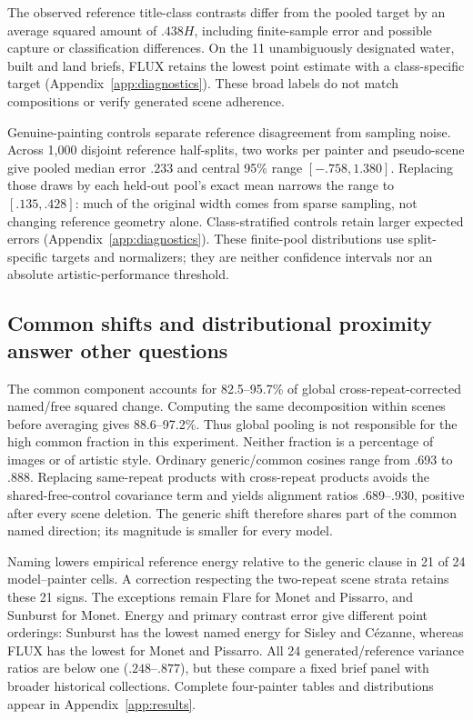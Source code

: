 

The observed reference title-class contrasts differ from the pooled target
by an average squared amount of $.438H$, including finite-sample error and
possible capture or classification differences. On the 11 unambiguously designated
water, built and land briefs, FLUX retains the lowest point estimate with a
class-specific target (Appendix~\ref{app:diagnostics}). These broad labels do
not match compositions or verify generated scene adherence.

Genuine-painting controls separate reference disagreement from sampling noise.
Across 1,000 disjoint reference half-splits, two works per painter and
pseudo-scene give pooled median error $.233$ and central 95\% range
$[-.758,1.380]$. Replacing those draws by each held-out pool's exact mean
narrows the range to $[.135,.428]$: much of the original width comes from sparse
sampling, not changing reference geometry alone. Class-stratified controls
retain larger expected errors (Appendix~\ref{app:diagnostics}). These finite-pool
distributions use split-specific targets and normalizers; they are neither
confidence intervals nor an absolute artistic-performance threshold.

\subsection{Common shifts and distributional proximity answer other questions}
The common component accounts for 82.5--95.7\% of global cross-repeat-corrected
named/free squared change. Computing the same decomposition within scenes
before averaging gives 88.6--97.2\%. Thus global pooling is not responsible
for the high common fraction in this experiment. Neither fraction is a
percentage of images or of artistic style. Ordinary generic/common cosines
range from .693 to .888. Replacing same-repeat products with cross-repeat
products avoids the shared-free-control covariance term and yields alignment
ratios .689--.930, positive after every scene deletion. The generic shift
therefore shares part of the common named direction; its magnitude is smaller
for every model.

Naming lowers empirical reference energy relative to the generic clause in
21 of 24 model--painter cells. A correction respecting the two-repeat scene
strata retains these 21 signs. The exceptions remain Flare for Monet and
Pissarro, and Sunburst for Monet. Energy and primary contrast error give
different point orderings: Sunburst has the lowest named energy for Sisley
and C\'ezanne, whereas FLUX has the lowest for Monet and Pissarro. All 24
generated/reference variance ratios are below one ($.248$--$.877$), but these
compare a fixed brief panel with broader historical collections. Complete
four-painter tables and distributions appear in Appendix~\ref{app:results}.

